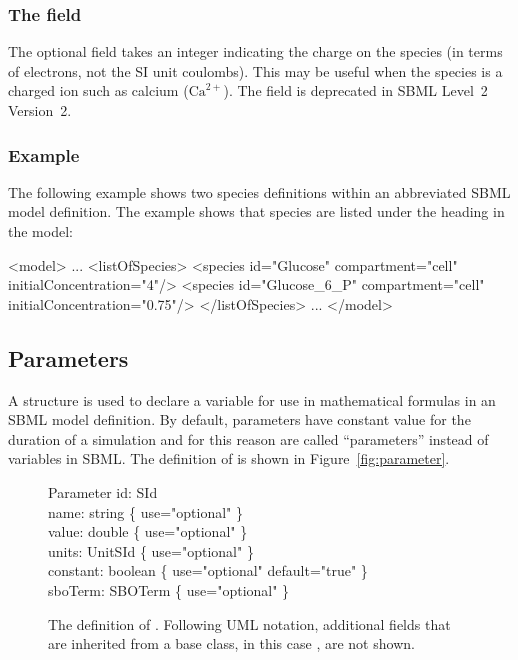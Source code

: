\subsubsection{The  field}
\label{sec:charge}

The optional field  takes an integer indicating the
charge on the species (in terms of electrons, not the SI unit
coulombs). This may be useful when the species is a charged ion
such as calcium ($\text{Ca}^{2+}$).  The  field is
deprecated in SBML Level~2 Version~2.


\subsubsection{Example}

The following example shows two species definitions within an
abbreviated SBML model definition.  The example shows that species
are listed under the heading  in the model:

\begin{example}
<model>
    ...
    <listOfSpecies>
        <species id="Glucose" compartment="cell" initialConcentration="4"/>
        <species id="Glucose_6_P" compartment="cell" initialConcentration="0.75"/>
    </listOfSpecies>
    ...
</model>
\end{example}


\subsection{Parameters}
\label{sec:parameters}

A \Parameter structure is used to declare a variable for use in
mathematical formulas in an SBML model definition.  By default, parameters
have constant value for the duration of a simulation and for this reason
are called ``parameters'' instead of variables in SBML.  The definition of
\Parameter is shown in Figure~\vref{fig:parameter}.

\begin{figure}[htb]
  \centering
  \begin{classbox}{Parameter}
    id: SId                                               \\
    name: string \{ use="optional" \}                     \\
    value: double \{ use="optional" \}                    \\
    units: UnitSId \{ use="optional" \}     \\
    constant: boolean \{ use="optional" default="true" \} \\
    sboTerm: SBOTerm \{ use="optional" \}   \\
  \end{classbox}
  \caption{The definition of \Parameter. Following UML notation, additional
    fields
    that are inherited from a base class, in this case \SBase, are not shown.}
  \label{fig:parameter}
\end{figure}


